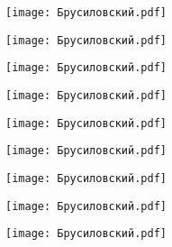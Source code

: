 \documentclass[main.tex]{subfiles}
\begin{document}
\begin{center}
\texttt{[image: Брусиловский.pdf]}
\end{center}



\begin{center}
\texttt{[image: Брусиловский.pdf]}
\end{center}



\begin{center}
\texttt{[image: Брусиловский.pdf]}
\end{center}



\begin{center}
\texttt{[image: Брусиловский.pdf]}
\end{center}



\begin{center}
\texttt{[image: Брусиловский.pdf]}
\end{center}



\begin{center}
\texttt{[image: Брусиловский.pdf]}
\end{center}



\begin{center}
\texttt{[image: Брусиловский.pdf]}
\end{center}



\begin{center}
\texttt{[image: Брусиловский.pdf]}
\end{center}



\begin{center}
\texttt{[image: Брусиловский.pdf]}
\end{center}
\end{document}
